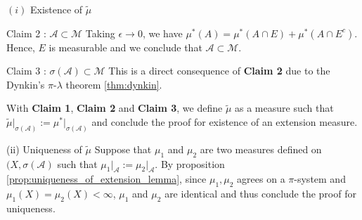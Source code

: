 \begin{proof*}
\begin{subproof}{$(i)$ Existence of $\tilde\mu$}
\begin{subproof}{\newline Claim 2 : $\mathcal{A} \subset \mathcal{M}$}
           \noindent Taking $\epsilon\to 0$, we have $\mu^*(A) = \mu^*(A\cap E) + \mu^*(A\cap E^c)$. Hence, $E$ is measurable and we conclude that $\mathcal{A}\subset\mathcal{M}$.
        \end{subproof}

        \begin{subproof}{\newline Claim 3 : $\sigma(\mathcal{A}) \subset \mathcal{M}$}
            \newline This is a direct consequence of \textbf{Claim 2} due to the Dynkin's $\pi$-$\lambda$ theorem \ref{thm:dynkin}.
        \end{subproof}

        \noindent\newline With \textbf{Claim 1}, \textbf{Claim 2} and \textbf{Claim 3}, we define $\tilde\mu$ as a measure such that $\tilde\mu\Big|_{\sigma(\mathcal{A})}:=\mu^*\Big|_{\sigma(\mathcal{A})}$ and conclude the proof for existence of an extension measure.
    \end{subproof}

    \begin{subproof}{\newline (ii) Uniqueness of $\tilde\mu$}
        Suppose that $\mu_1$ and $\mu_2$ are two measures defined on $(X, \sigma(\mathcal{A})$ such that $\mu_1\Big|_{\mathcal{A}} := \mu_2\Big|_{\mathcal{A}}$. By proposition \ref{prop:uniqueness_of_extension_lemma}, since $\mu_1, \mu_2$ agrees on a $\pi$-system and $\mu_1(X)=\mu_2(X)<\infty$, $\mu_1$ and $\mu_2$ are identical and thus conclude the proof for uniqueness.
    \end{subproof}
\end{proof*}
